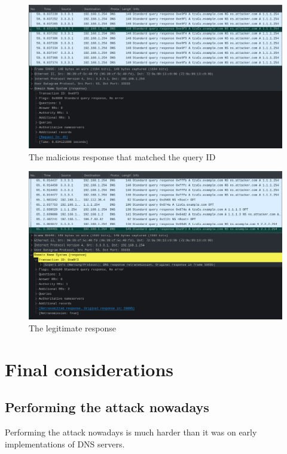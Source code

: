 \documentclass[11pt,a4paper]{article}
\begin{document}
\begin{figure}[h!]
  \includegraphics[width=\linewidth]{wireshark-2.png}
  \caption{The malicious response that matched the query ID}
  \label{fig:wireshark-2}
\end{figure}

\begin{figure}[h!]
  \includegraphics[width=\linewidth]{wireshark-3.png}
  \caption{The legitimate response}
  \label{fig:wireshark-3}
\end{figure}

\clearpage

\section{Final considerations}
\label{sec:final-considerations}

\subsection{Performing the attack nowadays}

Performing the attack nowadays is much harder than it was on early implementations of DNS servers. 
\end{document}
